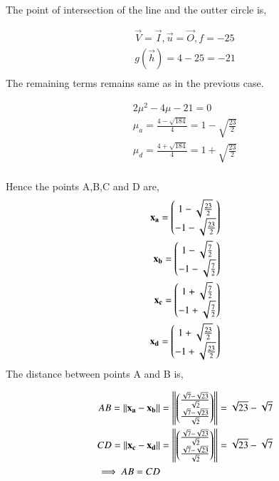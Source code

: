 \documentclass[journal,12pt,twocolumn]{IEEEtran}
\renewcommand\thesection{\arabic{section}}
\begin{document}
\begin{enumerate}
The point of intersection of the line and the outter circle is,

		\begin{align}
			\vec{V} = \vec{I}, \vec{u}=\vec{O},f=-25\\
			g(\vec{h}) = 4-25=-21\\
		\end{align}	
The remaining terms remains same as in the previous case.

		\begin{align}
			2\mu^2-4\mu-21=0\\
			\mu_a = \frac{4-\sqrt{184}}{4} = 1-\sqrt{\frac{23}{2}}\\
			\mu_d = \frac{4+\sqrt{184}}{4} = 1+\sqrt{\frac{23}{2}}\\
		\end{align}

Hence the points A,B,C and D are,
\begin{align}
	\mathbf{x_a} = \begin{pmatrix}1-\sqrt{\frac{23}{2}}\\-1-\sqrt{\frac{23}{2}}\end{pmatrix}\\
	\mathbf{x_b} = \begin{pmatrix}1-\sqrt{\frac{7}{2}}\\-1-\sqrt{\frac{7}{2}}\end{pmatrix}\\
	\mathbf{x_c} = \begin{pmatrix}1+\sqrt{\frac{7}{2}}\\-1+\sqrt{\frac{7}{2}}\end{pmatrix}\\
	\mathbf{x_d} = \begin{pmatrix}1+\sqrt{\frac{23}{2}}\\-1+\sqrt{\frac{23}{2}}\end{pmatrix}\\
\end{align}
The distance between points A and B is,

		\begin{align}
			AB = \left\lVert\mathbf{x_a}-\mathbf{x_b}\right\rVert &= \left\lVert\begin{pmatrix}\frac{\sqrt{7}-\sqrt{23}}{\sqrt{2}}\\\frac{\sqrt{7}-\sqrt{23}}{\sqrt{2}}\end{pmatrix}\right\rVert = \sqrt{23}-\sqrt{7}\\
			CD = \left\lVert\mathbf{x_c}-\mathbf{x_d}\right\rVert &= \left\lVert\begin{pmatrix}\frac{\sqrt{7}-\sqrt{23}}{\sqrt{2}}\\\frac{\sqrt{7}-\sqrt{23}}{\sqrt{2}}\end{pmatrix}\right\rVert = \sqrt{23}-\sqrt{7}\\
			\implies AB=CD
		\end{align}

\end{enumerate}

%
\end{document}
